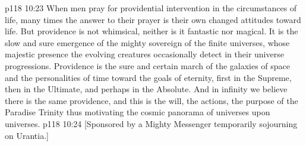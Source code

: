\vs p118 10:23 \pc When men pray for providential intervention in the circumstances of life, many times the answer to their prayer is their own changed attitudes toward life. But providence is not whimsical, neither is it fantastic nor magical. It is the slow and sure emergence of the mighty sovereign of the finite universes, whose majestic presence the evolving creatures occasionally detect in their universe progressions. Providence is the sure and certain march of the galaxies of space and the personalities of time toward the goals of eternity, first in the Supreme, then in the Ultimate, and perhaps in the Absolute. And in infinity we believe there is the same providence, and this is the will, the actions, the purpose of the Paradise Trinity thus motivating the cosmic panorama of universes upon universes.
\vsetoff
\vs p118 10:24 [Sponsored by a Mighty Messenger temporarily sojourning on Urantia.]
